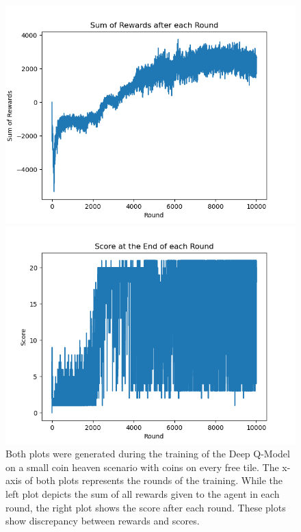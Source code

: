 \begin{figure}[H]
	\centering
	\begin{minipage}{0.49\textwidth}
		\centering
		\includegraphics[scale=0.52]{images/rewards_converged.png}
	\end{minipage}
	\begin{minipage}{0.49\textwidth}
		\centering
		\includegraphics[scale=0.52]{images/scores_not_converged.png}
	\end{minipage}
	\caption{Both plots were generated during the training of the Deep Q-Model on a small coin heaven scenario with coins on every free tile. The x-axis of both plots represents the rounds of the training. While the left plot depicts the sum of all rewards given to the agent in each round, the right plot shows the score after each round. These plots show discrepancy between rewards and scores.}
	\label{fig:rewardVSscore}
\end{figure}

